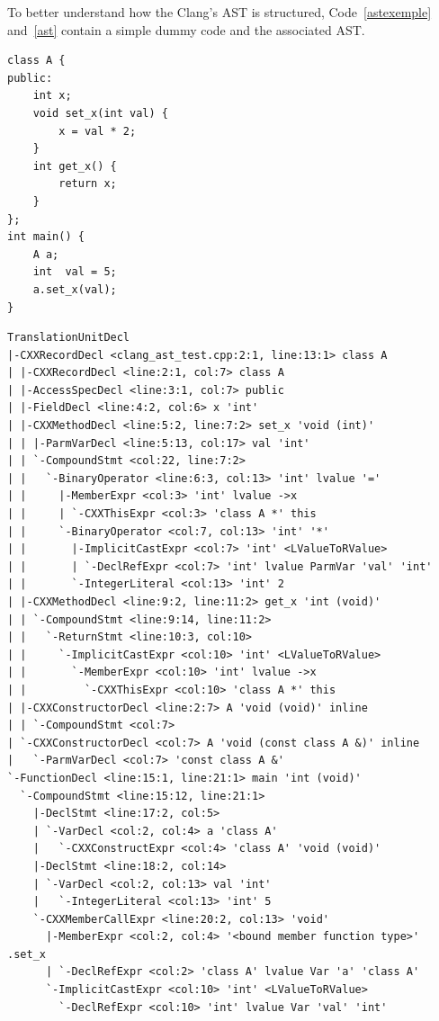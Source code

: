 \documentclass[a4paper,11pt,oneside]{book}
\begin{document}
To better understand how the Clang’s AST is structured, Code~\ref{astexemple} and~\ref{ast} contain a simple dummy code and the associated AST.
\newline
\begin{lstlisting}[language=CCC, caption=Simple code., label=astexemple]
class A {
public:
	int x;
	void set_x(int val) {
		x = val * 2;
	}	
	int get_x() {
		return x;
	}
};
int main() {
	A a;
	int  val = 5;
	a.set_x(val);
}
\end{lstlisting}

\begin{lstlisting}[language=AST, caption=Clang AST of the simple code., label=ast]
TranslationUnitDecl
|-CXXRecordDecl <clang_ast_test.cpp:2:1, line:13:1> class A
| |-CXXRecordDecl <line:2:1, col:7> class A
| |-AccessSpecDecl <line:3:1, col:7> public
| |-FieldDecl <line:4:2, col:6> x 'int'
| |-CXXMethodDecl <line:5:2, line:7:2> set_x 'void (int)'
| | |-ParmVarDecl <line:5:13, col:17> val 'int'
| | `-CompoundStmt <col:22, line:7:2>
| |   `-BinaryOperator <line:6:3, col:13> 'int' lvalue '='
| |     |-MemberExpr <col:3> 'int' lvalue ->x
| |     | `-CXXThisExpr <col:3> 'class A *' this
| |     `-BinaryOperator <col:7, col:13> 'int' '*'
| |       |-ImplicitCastExpr <col:7> 'int' <LValueToRValue>
| |       | `-DeclRefExpr <col:7> 'int' lvalue ParmVar 'val' 'int'
| |       `-IntegerLiteral <col:13> 'int' 2
| |-CXXMethodDecl <line:9:2, line:11:2> get_x 'int (void)'
| | `-CompoundStmt <line:9:14, line:11:2>
| |   `-ReturnStmt <line:10:3, col:10>
| |     `-ImplicitCastExpr <col:10> 'int' <LValueToRValue>
| |       `-MemberExpr <col:10> 'int' lvalue ->x
| |         `-CXXThisExpr <col:10> 'class A *' this
| |-CXXConstructorDecl <line:2:7> A 'void (void)' inline
| | `-CompoundStmt <col:7>
| `-CXXConstructorDecl <col:7> A 'void (const class A &)' inline
|   `-ParmVarDecl <col:7> 'const class A &'
`-FunctionDecl <line:15:1, line:21:1> main 'int (void)'
  `-CompoundStmt <line:15:12, line:21:1>
    |-DeclStmt <line:17:2, col:5>
    | `-VarDecl <col:2, col:4> a 'class A'
    |   `-CXXConstructExpr <col:4> 'class A' 'void (void)'
    |-DeclStmt <line:18:2, col:14>
    | `-VarDecl <col:2, col:13> val 'int'
    |   `-IntegerLiteral <col:13> 'int' 5
    `-CXXMemberCallExpr <line:20:2, col:13> 'void'
      |-MemberExpr <col:2, col:4> '<bound member function type>' .set_x
      | `-DeclRefExpr <col:2> 'class A' lvalue Var 'a' 'class A'
      `-ImplicitCastExpr <col:10> 'int' <LValueToRValue>
        `-DeclRefExpr <col:10> 'int' lvalue Var 'val' 'int'
\end{lstlisting}
\end{document}
